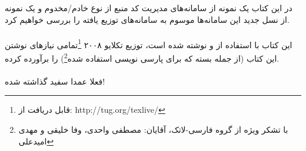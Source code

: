 در این کتاب یک نمونه از سامانه‌های مدیریت کد منبع از نوع خادم/مخدوم و یک نمونه از نسل جدید این سامانه‌ها موسوم به سامانه‌های توزیع یافته را بررسی خواهیم کرد.

\paragraph{}
این کتاب با استفاده از \mbox{\lr{\TeX\\}} و \mbox{\lr{\XeTeX\\}} نوشته شده است، توزیع تکلایو ۲۰۰۸ \footnote{قابل دریافت از: http://tug.org/texlive/}تمامی نیازهای نوشتن این کتاب (از جمله بسته \mbox{\lr{\XePersian\\}} که برای پارسی نویسی استفاده شده\footnote{با تشکر ویژه از گروه فارسی-لاتک،‌ آقایان: مصطفی واحدی، وفا خلیقی و مهدی امیدعلی}) را برآورده کرده.\\
\paragraph{}
{\sols فعلا عمدا سفید گذاشته شده!}


